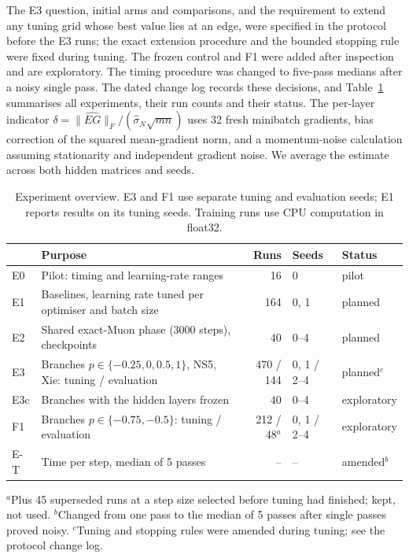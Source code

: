 \documentclass[11pt,a4paper]{article}
\begin{document}
The E3 question, initial arms and comparisons, and the requirement to extend any tuning grid whose best value lies at an edge, were specified in the protocol before the E3 runs; the exact extension procedure and the bounded stopping rule were fixed during tuning. The frozen control and F1 were added after inspection and are exploratory. The timing procedure was changed to five-pass medians after a noisy single pass. The dated change log records these decisions, and Table~\ref{tab:experiments} summarises all experiments, their run counts and their status. The per-layer indicator $\delta=\|\widehat{E G}\|_F/(\widehat\sigma_N\sqrt{mn})$ uses 32 fresh minibatch gradients, bias correction of the squared mean-gradient norm, and a momentum-noise calculation assuming stationarity and independent gradient noise. We average the estimate across both hidden matrices and seeds.

\begin{table}[!htbp]
  \centering
  \caption{Experiment overview. E3 and F1 use separate tuning and evaluation seeds; E1 reports results on its tuning seeds. Training runs use CPU computation in float32.}
  \label{tab:experiments}
  \small
  \begin{tabular}{@{}lp{6.4cm}rll@{}}
    \toprule
         & Purpose                                                              & Runs              & Seeds        & Status         \\
    \midrule
    E0   & Pilot: timing and learning-rate ranges                               & 16                & 0            & pilot          \\
    E1   & Baselines, learning rate tuned per optimiser and batch size          & 164               & 0, 1         & planned \\
    E2   & Shared exact-Muon phase (3000 steps), checkpoints                    & 40                & 0--4         & planned \\
    E3   & Branches $p \in \{-0.25, 0, 0.5, 1\}$, NS5, Xie: tuning / evaluation & 470 / 144         & 0, 1 / 2--4  & planned$^{c}$ \\
    E3c  & Branches with the hidden layers frozen                               & 40                & 0--4         & exploratory    \\
    F1   & Branches $p \in \{-0.75, -0.5\}$: tuning / evaluation                & 212 / 48$^{a}$    & 0, 1 / 2--4  & exploratory    \\
    E-T  & Time per step, median of 5 passes                                    & --                & --           & amended$^{b}$ \\
    \bottomrule
  \end{tabular}

  \smallskip
  \footnotesize $^{a}$Plus 45 superseded runs at a step size selected before tuning had finished; kept,
  not used. $^{b}$Changed from one pass to the median of 5 passes after single passes proved noisy. $^{c}$Tuning and stopping rules were amended during tuning; see the protocol change log.
\end{table}
\end{document}
